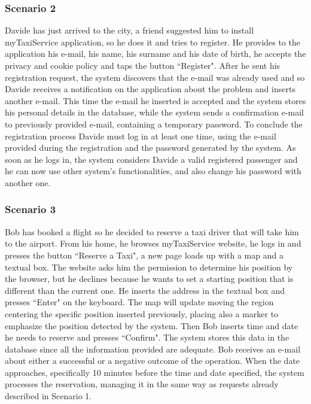 \documentclass[a4paper,12pt,dvipsnames]{article}%
\begin{document}
\subsubsection{Scenario 2}
Davide has just arrived to the city, a friend suggested him to install myTaxiService application, so he does it and tries to register.
He provides to the application his e-mail, his name, his surname and his date of birth, he accepts the privacy and cookie policy and taps the button ``Register". After he sent his registration request, the system discovers that the e-mail was already used and so Davide receives a notification on the application about the problem and inserts another e-mail.
This time the e-mail he inserted is accepted and the system stores his personal details in the database, while the system sends a confirmation e-mail to previously provided e-mail, containing a temporary password.
To conclude the registration process Davide must log in at least one time, using the e-mail provided during the registration and the password generated by the system.
As soon as he logs in, the system considers Davide a valid registered passenger and he can now use other system's functionalities, and also change his password with another one.  
\subsubsection{Scenario 3}
Bob has booked a flight so he decided to reserve a taxi driver that will take him to the airport.
From his home, he browses myTaxiService website, he logs in and presses the button ``Reserve a Taxi", a new page loads up with a map and a textual box.
The website asks him the permission to determine his position by the browser, but he declines because he wants to set a starting position that is different than the current one.
He inserts the address in the textual box and presses ``Enter" on the keyboard. The map will update moving the region centering the specific position inserted previously, placing also a marker to emphasize the position detected by the system.
Then Bob inserts time and date he needs to reserve and presses ``Confirm".
The system stores this data in the database since all the information provided are adequate. Bob receives an e-mail about either a successful or a negative outcome of the operation.
When the date approaches, specifically 10 minutes before the time and date specified, the system processes the reservation, managing it in the same way as requests already described in Scenario 1. 
\end{document}
